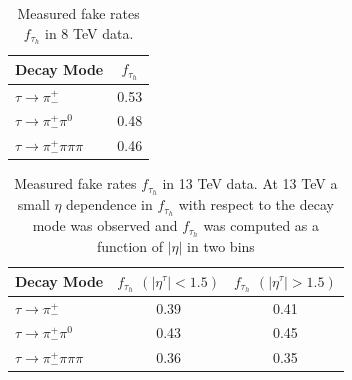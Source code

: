 \documentclass[oneside, letterpaper, oldfontcommands]{memoir}
\begin{document}
\begin{table}[htbp]
  \centering
  \begin{tabular}{ | l | c |}
    \hline
    Decay Mode & $f_{\tau_{h}}$ \\ \hline \hline
    $\tau \rightarrow \pi^{+}_{ - }$ & 0.53 \\ \hline
    $\tau \rightarrow \pi^{+}_{ - }\pi^{0}$ & 0.48 \\ \hline
    $\tau \rightarrow \pi^{+}_{ - }\pi\pi\pi$& 0.46 \\ \hline
    
  \end{tabular}
  \caption{Measured fake rates $f_{\tau_{h}}$ in 8 TeV data.}
  \label{tab:taufakerate8TeV}
\end{table}

\begin{table}[htbp]
  \centering
  \begin{tabular}{ | l | c | c |}
    \hline
    Decay Mode & $f_{\tau_{h}}$ $\left(|\eta^{\tau}|<1.5\right)$ & $f_{\tau_{h}}$ $\left(|\eta^{\tau}|>1.5\right)$ \\ \hline \hline
    $\tau \rightarrow \pi^{+}_{ - }$ & 0.39 & 0.41 \\ \hline
    $\tau \rightarrow \pi^{+}_{ - }\pi^{0}$ & 0.43 & 0.45 \\ \hline
    $\tau \rightarrow \pi^{+}_{ - }\pi\pi\pi$& 0.36 & 0.35 \\ \hline
  \end{tabular}
  \caption{Measured fake rates $f_{\tau_{h}}$ in 13 TeV data. At 13 TeV a small $\eta$ dependence in $f_{\tau_{h}}$ with respect to the decay mode was observed and $f_{\tau_{h}}$ was computed as a function of $|\eta|$ in two bins}
  \label{tab:taufakerate13TeV}
\end{table}
\end{document}
